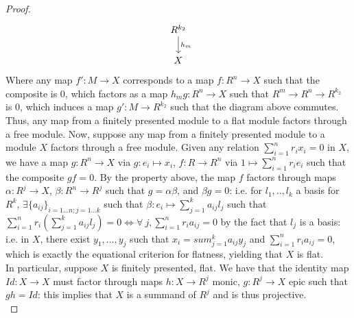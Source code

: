 \documentclass{article}
\begin{document}
\begin{proof}
\[\begin{tikzcd}
              & R^{k_2} \arrow[d, "h_m"]                                    &                                                                       \\
              & X                                                           &                                                                      
\end{tikzcd}
\]
Where any map $f': M \to X$ corresponds to a map $f: R^{n} \to X$ such that the composite is 0, which factors as a map $h_{m}g: R^{n} \to X$ such that $R^{m} \to R^{n} \to R^{k_{2}}$ is $0$, which induces a map $g':M \to R^{k_{2}}$ such that the diagram above commutes. Thus, any map from a finitely presented module to a flat module factors through a free module. Now, suppose any map from a finitely presented module to a module $X$ factors through a free module. Given any relation $\sum_{i=1}^{n}r_{i}x_{i} = 0$ in $X$, we have a map $g: R^{n} \to X$ via $g: e_{i} \mapsto x_{i}$, $f:R \to R^{n}$ via $1 \mapsto \sum_{i=1}^{n}r_{i}e_{i}$ such that the composite $gf = 0$. By the property above, the map $f$ factors through maps $\alpha:R^{j} \to X$, $\beta:R^{n} \to R^{j}$ such that $g = \alpha \beta$, and $\beta g = 0$: i.e. for $l_{1},..,l_{k}$ a basis for $R^{k}$, $\exists \{a_{ij}\}_{i=1...n;j=1...k}$ such that $\beta: e_{i} \mapsto \sum_{j=1}^{k}a_{ij}l_{j}$ such that $\sum_{i=1}^{n} r_{i}(\sum_{j=1}^{k}a_{ij}l_{j}) = 0 \iff \forall \ j, \sum_{i=1}^{n}r_{i}a_{ij} = 0$ by the fact that $l_{j}$ is a basis: i.e. in $X$, there exist $y_{1},...,y_{j}$ such that $x_{i} = sum_{j=1}^{k}a_{ij}y_{j}$ and $\sum_{i=1}^{n}r_{i}a_{ij} = 0$, which is exactly the equational criterion for flatness, yielding that $X$ is flat. \\
In particular, suppose $X$ is finitely presented, flat. We have that the identity map $Id: X \to X$ must factor through maps $h: X \to R^{j}$ monic, $g:R^{j} \to X$ epic such that $gh = Id$: this implies that $X$ is a summand of $R^{j}$ and is thus projective. \\


\end{proof}
\end{document}
